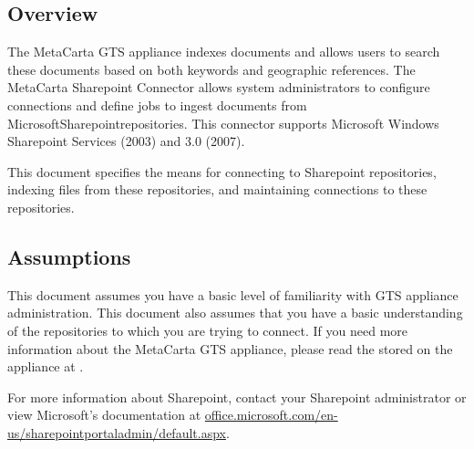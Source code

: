 %
%

\begin{changemargin}{1.5in}{0in}

\section{Overview}

The MetaCarta GTS appliance indexes documents and allows users to
search these documents based on both keywords and geographic
references. The MetaCarta Sharepoint Connector allows system
administrators to configure connections and define jobs to ingest
documents from Microsoft\circler Sharepoint\circler repositories. This
connector supports Microsoft Windows Sharepoint Services
(2003) and 3.0 (2007).

This document specifies the means for connecting to Sharepoint
repositories, indexing files from these repositories, and maintaining
connections to these repositories.

\subsection{Assumptions}

This document assumes you have a basic level of familiarity with GTS
appliance administration. This document also assumes that you have a
basic understanding of the repositories to which you are trying to
connect. If you need more information about the MetaCarta GTS
appliance, please read the  stored on the appliance at
.

For more information about Sharepoint, contact your Sharepoint
administrator or view Microsoft's documentation at
\url{office.microsoft.com/en-us/}\linebreak\url{sharepointportaladmin/default.aspx}.


\end{changemargin}
